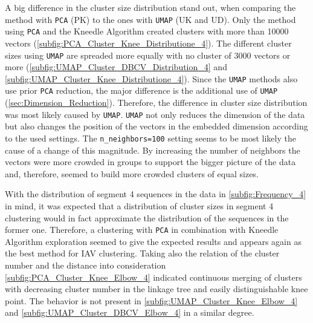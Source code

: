 A big difference in the cluster size distribution stand out, when comparing the method with \texttt{PCA} (PK) to the ones with \texttt{UMAP} (UK and UD). Only the method using \texttt{PCA} and the Kneedle Algorithm created clusters with more than 10000 vectors (\autoref{subfig:PCA_Cluster_Knee_Distributione_4}). The different cluster sizes using \texttt{UMAP} are spreaded more equally with no cluster of 3000 vectors or more (\autoref{subfig:UMAP_Cluster_DBCV_Distribution_4} and \autoref{subfig:UMAP_Cluster_Knee_Distributione_4}). Since the \texttt{UMAP} methods also use prior \texttt{PCA} reduction, the major difference is the additional use of \texttt{UMAP} (\autoref{sec:Dimension_Reduction}). Therefore, the difference in cluster size distribution was most likely caused by \texttt{UMAP}. \texttt{UMAP} not only reduces the dimension of the data but also changes the position of the vectors in the embedded dimension according to the used settings. The \texttt{n\_neighbors=100} setting seems to be most likely the cause of a change of this magnitude. By increasing the number of neighbors the vectors were more crowded in groups to support the bigger picture of the data and, therefore, seemed to build more crowded clusters of equal sizes. 

\vspace{1em}

With the distribution of segment 4 sequences in the data in \autoref{subfig:Frequency_4} in mind, it was expected that a distribution of cluster sizes in segment 4 clustering would in fact approximate the distribution of the sequences in the former one. Therefore, a clustering with \texttt{PCA} in combination with Kneedle Algorithm exploration seemed to give the expected results and appears again as the best method for \gls{IAV} clustering. Taking also the relation of the cluster number and the distance into consideration \autoref{subfig:PCA_Cluster_Knee_Elbow_4} indicated continuous merging of clusters with decreasing cluster number in the linkage tree and easily distinguishable knee point. The behavior is not present in \autoref{subfig:UMAP_Cluster_Knee_Elbow_4} and \autoref{subfig:UMAP_Cluster_DBCV_Elbow_4} in a similar degree.  


